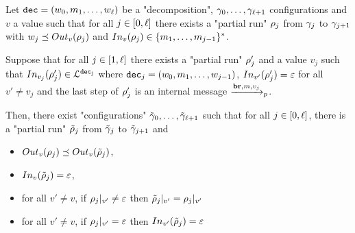 \begin{lemma}
	\label{lem:follower-composition-completion}
	Let $\decsymb = (w_0, m_1, \ldots, w_\ell)$ be a "decomposition", $\config_0, \ldots, \config_{\ell+1}$ configurations and $v$ a value such that for all $j \in\nset{0}{\ell}$ there exists a "partial run" $\run_j$ from $\config_{j}$ to $\config_{j+1}$ with $w_j \subword \voutput{v}{\run_j}$ and $\vinput{v}{\run_j} \in \set{m_1,\ldots, m_{j-1}}^*$.
	
	Suppose that for all $j \in\nset{1}{\ell}$ there exists a "partial run" $\run'_j$ and a value $v_j$ such that $\vinput{v_j}{\run'_j} \in \langdec{\decsymb_j}$ where $\decsymb_j = (w_0, m_1, \ldots, w_{j-1})$, $\vinput{v'}{\run'_j} = \varepsilon$ for all $v' \neq v_j$ and the last step of $\run'_j$ is an internal message $\intmessage{m}{v_j}$.
	
	Then, there exist "configurations" $\Tilde{\config}_0, \ldots, \Tilde{\config}_{\ell+1}$ such that for all $j \in\nset{0}{\ell}$, there is a "partial run" $\Tilde{\run}_j$ from $\Tilde{\config}_j$ to $\Tilde{\config}_{j+1}$ and
	\begin{itemize}
		\item $\voutput{v}{\run_j} \subword \voutput{v}{\Tilde{\run}_j}$, 
		
		\item $\vinput{v}{\Tilde{\run}_j} = \varepsilon$,
		
		\item for all $v' \neq v$, if $\vproj{v'}{\run_j} \neq \varepsilon$ then $\vproj{v'}{\Tilde{\run}_j} = \vproj{v'}{\run_j}$
		
		\item for all $v' \neq v$, if $\vproj{v'}{\run_j} = \varepsilon$ then $\vinput{v'}{\Tilde{\run}_j} = \varepsilon$
\end{itemize}
\end{lemma}


